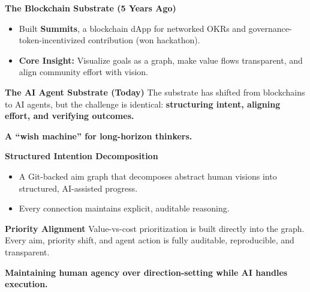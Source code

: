 \documentclass[12pt]{article}
\newcommand{\slide}[1]{%
  \clearpage
  \pagecolor{bgdark}
  \color{textlight}
  \noindent{\Large\bfseries\color{aimgold}{#1}}\par
  \vspace{0.6cm}
}
\newcommand{\col}[2]{%
  \begin{minipage}[t]{#1\textwidth}
    #2
  \end{minipage}%
}
\newcommand{\card}[2]{%
  \colorbox{bgcard}{%
    \begin{minipage}{\dimexpr#1\textwidth-2\fboxsep-2\fboxrule\relax}%
      \vspace{0.2cm}%
      \color{textlight}%
      #2%
      \vspace{0.2cm}%
    \end{minipage}%
  }%
}
\newenvironment{slideitemize}{%
  \begin{itemize}%
    \setlength{\itemsep}{4pt}%
    \setlength{\parskip}{0pt}%
    \setlength{\parsep}{0pt}%
}{%
  \end{itemize}%
}
\begin{document}
\col{0.5}{
  \textbf{The Blockchain Substrate (5 Years Ago)}
  \begin{slideitemize}
    \item Built \textbf{Summits}, a blockchain dApp for networked OKRs and governance-token-incentivized contribution (won hackathon).
    \item \textbf{Core Insight:} Visualize goals as a graph, make value flows transparent, and align community effort with vision.
  \end{slideitemize}
}
\hfill
\col{0.45}{
  \card{1.0}{
    \hspace{0.2cm}%
    \begin{minipage}{\dimexpr\textwidth-0.4cm\relax}
      \textbf{\color{aimcyan}The AI Agent Substrate (Today)}
      \vspace{0.2cm}
      The substrate has shifted from blockchains to AI agents, but the challenge is identical: \textbf{structuring intent, aligning effort, and verifying outcomes.}
    \end{minipage}
  }
}

\slide{What Aimparency Is: The Wish Machine}
\large \textbf{A ``wish machine'' for long-horizon thinkers.}
\vspace{0.8cm}
\normalsize

\col{0.48}{
  \textbf{Structured Intention Decomposition}
  \begin{slideitemize}
    \item A Git-backed aim graph that decomposes abstract human visions into structured, AI-assisted progress.
    \item Every connection maintains explicit, auditable reasoning.
  \end{slideitemize}
}
\hfill
\col{0.48}{
  \card{1.0}{
    \hspace{0.2cm}%
    \begin{minipage}{\dimexpr\textwidth-0.4cm\relax}
      \textbf{\color{aimgold}Priority Alignment}
      \vspace{0.2cm}
      Value-vs-cost prioritization is built directly into the graph. Every aim, priority shift, and agent action is fully auditable, reproducible, and transparent.
    \end{minipage}
  }
}

\slide{Cognitive Sovereignty: Steering vs. Execution}
\large \textbf{Maintaining human agency over direction-setting while AI handles execution.}
\vspace{0.8cm}
\normalsize
\end{document}
